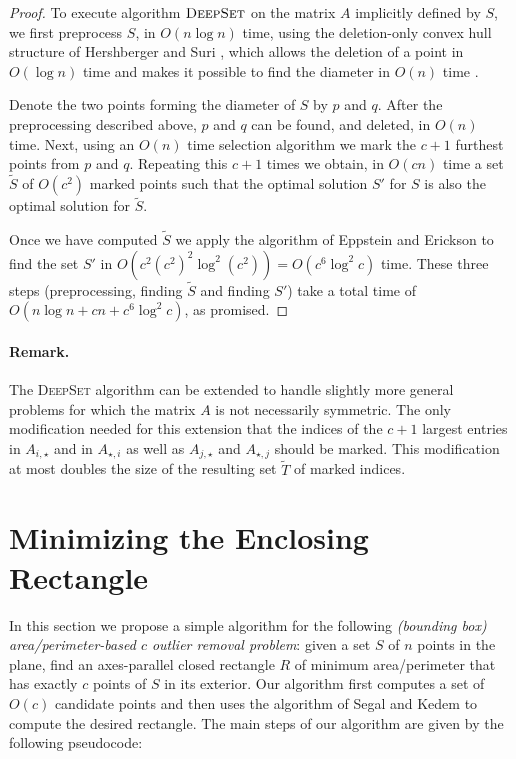 \documentclass[lotsofwhite]{patmorin}
\begin{document}
\begin{proof}
To execute algorithm $\textsc{DeepSet}$ on the matrix $A$ implicitly
defined by $S$, we first preprocess $S$, in $O(n\log n)$ time, using
the deletion-only convex hull structure of Hershberger and Suri
\cite{hs92}, which allows the deletion of a point in $O(\log n)$ time
and makes it possible to find the diameter in $O(n)$ time \cite{s78}.

Denote the two points forming the diameter of $S$ by $p$ and $q$.
After the preprocessing described above, $p$ and $q$ can be found, and
deleted, in $O(n)$ time.  Next, using an $O(n)$ time selection
algorithm we mark the $c+1$ furthest points from $p$ and $q$.
Repeating this $c+1$ times we obtain, in $O(cn)$ time a set
$\tilde{S}$ of $O(c^2)$ marked points such that the optimal solution
$S'$ for $S$ is also the optimal solution for $\tilde{S}$.

Once we have computed $\tilde{S}$ we apply the algorithm of Eppstein
and Erickson \cite{ee94} to find the set $S'$ in $O(c^2 (c^2)^2\log^2
(c^2)) = O(c^6\log^2 c)$ time.  These three steps (preprocessing,
finding $\tilde{S}$ and finding $S'$) take a total time of $O(n\log n
+ cn + c^6 \log^2 c)$, as promised.
\end{proof}

\paragraph{Remark.} The \textsc{DeepSet} algorithm can be extended to
handle slightly more general problems for which the matrix $A$ is not
necessarily symmetric.  The only modification needed for this
extension that the indices of the $c+1$ largest entries in
$A_{i,\star}$ and in $A_{\star,i}$ as well as $A_{j,\star}$ and
$A_{\star,j}$ should be marked.  This modification at most doubles the
size of the resulting set $\tilde{T}$ of marked indices.

\section{Minimizing the Enclosing Rectangle}

In this section we propose a simple algorithm for the following
\emph{(bounding box) area/perimeter-based $c$ outlier removal
problem}: given a set $S$ of $n$ points in the plane, find an
axes-parallel closed rectangle $R$ of minimum area/perimeter that has
exactly $c$ points of $S$ in its exterior.  Our algorithm first
computes a set of $O(c)$ candidate points and then uses the algorithm
of Segal and Kedem \cite{sk98} to compute the desired rectangle.  The
main steps of our algorithm are given by the following pseudocode:
\end{document}
